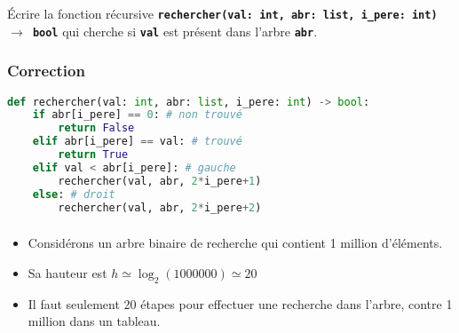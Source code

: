 \documentclass[svgnames,11pt]{beamer}
\begin{document}
\begin{frame}
    \begin{activite}
        Écrire la fonction récursive \textbf{\texttt{rechercher(val: int, abr: list, i\_pere: int) $\rightarrow$ bool}} qui cherche si \textbf{\texttt{val}} est présent dans l'arbre \textbf{\texttt{abr}}.
    \end{activite}


\end{frame}
\begin{frame}[fragile]
    \frametitle{Correction}

    \begin{center}
        \begin{lstlisting}[language=Python , basicstyle=\ttfamily\small, xleftmargin=0.5em, xrightmargin=-3em]
def rechercher(val: int, abr: list, i_pere: int) -> bool:
    if abr[i_pere] == 0: # non trouvé
        return False
    elif abr[i_pere] == val: # trouvé
        return True
    elif val < abr[i_pere]: # gauche
        rechercher(val, abr, 2*i_pere+1)
    else: # droit
        rechercher(val, abr, 2*i_pere+2)
\end{lstlisting}
    \end{center}

\end{frame}
\begin{frame}
    \frametitle{}

    \begin{itemize}
        \item<1-> Considérons un arbre binaire de recherche qui contient 1 million d'éléments.
        \item<2-> Sa hauteur est $h\simeq \log_2(1000000)\simeq 20$
        \item<3-> Il faut seulement 20 étapes pour effectuer une recherche dans l'arbre, contre 1 million dans un tableau.
    \end{itemize}
\end{frame}
\end{document}
